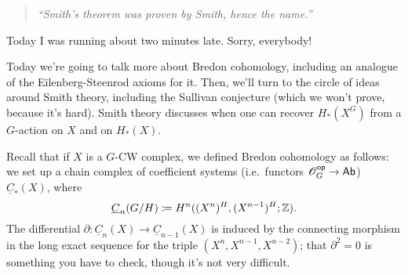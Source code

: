 
\begin{quote}\textit{
	``Smith's theorem was proven by Smith, hence the name.''
}\end{quote}
Today I was running about two minutes late. Sorry, everybody!

Today we're going to talk more about Bredon cohomology, including an analogue of the Eilenberg-Steenrod axioms for
it. Then, we'll turn to the circle of ideas around Smith theory, including the Sullivan conjecture (which we won't
prove, because it's hard). Smith theory discusses when one can recover $H_*(X^G)$ from a $G$-action on $X$ and on
$H_*(X)$.

Recall that if $X$ is a $G$-CW complex, we defined Bredon cohomology as follows: we set up a chain complex of
coefficient systems (i.e.\ functors $\mathscr O_G^{\mathsf{op}}\to\mathsf{Ab}$) $\underline C_*(X)$, where
\[\underline C_n(G/H)\coloneqq H^n((X^n)^H, (X^{n-1})^H; \mathbb Z).\]
The differential $\partial:\underline C_n(X)\to\underline C_{n-1}(X)$ is induced by the connecting morphism in the
long exact sequence for the triple $(X^n, X^{n-1}, X^{n-2})$; that $\partial^2 = 0$ is something you have to check,
though it's not very difficult.

